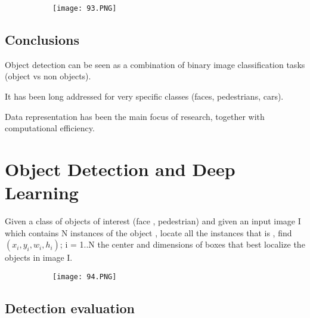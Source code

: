 \documentclass{article}
\begin{document}
\begin{figure}[ht!]
  \centering
  \begin{subfigure}[b]{0.7\linewidth}
    \texttt{[image: 93.PNG]}
  \end{subfigure}
\end{figure}

\subsection{Conclusions}

Object detection can be seen as a combination of binary image classification tasks (object vs non objects).

It has been long addressed for very specific classes (faces, pedestrians, cars).

Data representation has been the main focus of research, together with computational efficiency.

\section{Object Detection and Deep Learning}

Given a class of objects of interest (face , pedestrian) and given an input image I which contains N instances of the object , locate all the instances that is , find ${(x_i,y_i,w_i,h_i)}$; i = 1..N the center and dimensions of boxes that best localize the objects in image I.

\begin{figure}[ht!]
  \centering
  \begin{subfigure}[b]{0.5\linewidth}
    \texttt{[image: 94.PNG]}
  \end{subfigure}
\end{figure}

\subsection{Detection evaluation}
\end{document}
